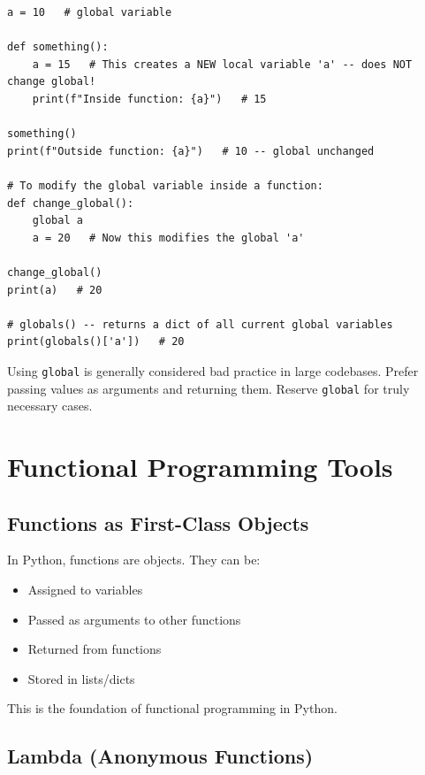 \documentclass[12pt,a4paper]{article}
\newcommand{\code}[1]{\texttt{\small\color{pyblue}#1}}
\begin{document}
\begin{lstlisting}
a = 10   # global variable

def something():
    a = 15   # This creates a NEW local variable 'a' -- does NOT change global!
    print(f"Inside function: {a}")   # 15

something()
print(f"Outside function: {a}")   # 10 -- global unchanged

# To modify the global variable inside a function:
def change_global():
    global a
    a = 20   # Now this modifies the global 'a'

change_global()
print(a)   # 20

# globals() -- returns a dict of all current global variables
print(globals()['a'])   # 20
\end{lstlisting}

\begin{warnbox}
Using \code{global} is generally considered bad practice in large codebases. Prefer passing values as arguments and returning them. Reserve \code{global} for truly necessary cases.
\end{warnbox}

\section{Functional Programming Tools}

\subsection{Functions as First-Class Objects}

In Python, functions are objects. They can be:
\begin{itemize}
  \item Assigned to variables
  \item Passed as arguments to other functions
  \item Returned from functions
  \item Stored in lists/dicts
\end{itemize}

This is the foundation of functional programming in Python.

\subsection{Lambda (Anonymous Functions)}
\end{document}
